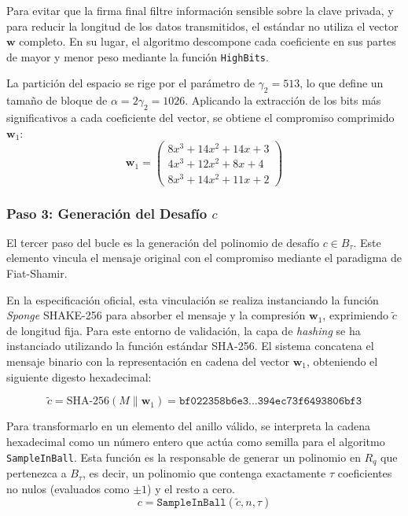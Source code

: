 \documentclass[11pt, a4paper]{report}
\theoremstyle{definition}
\begin{document}
Para evitar que la firma final filtre información sensible sobre la clave privada, y para reducir la longitud de los datos transmitidos, el estándar no utiliza el vector $\mathbf{w}$ completo. En su lugar, el algoritmo descompone cada coeficiente en sus partes de mayor y menor peso mediante la función \texttt{HighBits}.

La partición del espacio se rige por el parámetro de $\gamma_2 = 513$, lo que define un tamaño de bloque de $\alpha = 2\gamma_2 = 1026$. Aplicando la extracción de los bits más significativos a cada coeficiente del vector, se obtiene el compromiso comprimido $\mathbf{w}_1$:
\begin{equation}
    \mathbf{w}_1 = \begin{pmatrix}
    8x^3 + 14x^2 + 14x + 3 \\
    4x^3 + 12x^2 + 8x + 4 \\
    8x^3 + 14x^2 + 11x + 2
    \end{pmatrix}
\end{equation}

\subsubsection*{Paso 3: Generación del Desafío $c$}
El tercer paso del bucle es la generación del polinomio de desafío $c \in B_\tau$. Este elemento vincula el mensaje original con el compromiso mediante el paradigma de Fiat-Shamir.

En la especificación oficial, esta vinculación se realiza instanciando la función \textit{Sponge} SHAKE-256 para absorber el mensaje y la compresión $\mathbf{w}_1$, exprimiendo $\tilde{c}$ de longitud fija. Para este entorno de validación, la capa de \textit{hashing} se ha instanciado utilizando la función estándar SHA-256. El sistema concatena el mensaje binario con la representación en cadena del vector $\mathbf{w}_1$, obteniendo el siguiente digesto hexadecimal:

\begin{equation}
    \tilde{c} = \text{SHA-256}(M \parallel \mathbf{w}_1) = \texttt{bf022358b6e3...394ec73f6493806bf3}
\end{equation}

Para transformarlo en un elemento del anillo válido, se interpreta la cadena hexadecimal como un número entero que actúa como semilla para el algoritmo \texttt{SampleInBall}. Esta función es la responsable de generar un polinomio en $R_q$ que pertenezca a $B_\tau$, es decir, un polinomio que contenga exactamente $\tau$ coeficientes no nulos (evaluados como $\pm 1$) y el resto a cero.
\begin{equation}
    c = \texttt{SampleInBall}(\tilde{c}, n, \tau)
\end{equation}
\end{document}
